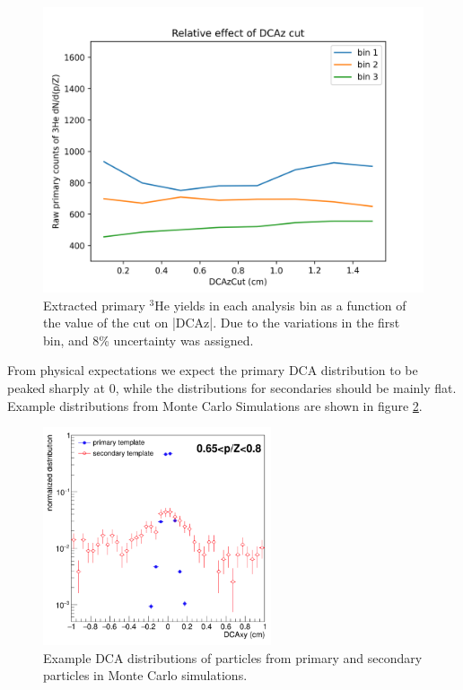 \begin{figure}
    \centering
    \includegraphics[width=\textwidth]{figures/Effect_of_DCAz_cut.png}
    \caption{Extracted primary $^3\mathrm{He}$ yields in each analysis bin as a function of the value of the cut on |DCAz|. Due to the variations in the first bin, and 8\% uncertainty was assigned.}
    \label{fig:DCAzcutEffect}
\end{figure}

From physical expectations we expect the primary DCA distribution to be peaked sharply at 0, while the distributions for secondaries should be mainly flat. Example distributions from Monte Carlo Simulations are shown in figure \ref{fig:ExampleDCADistributions}.

\begin{figure}
    \centering
    \includegraphics[width=0.6\textwidth]{figures/Example_templates.png}
    \caption{Example DCA distributions of particles from primary and secondary particles in Monte Carlo simulations.}
    \label{fig:ExampleDCADistributions}
\end{figure}

